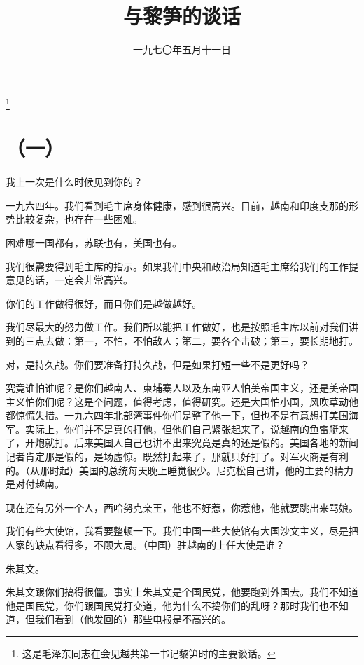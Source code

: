 
\title{与黎笋的谈话}
\date{一九七〇年五月十一日}
\thanks{这是毛泽东同志在会见越共第一书记黎笋时的主要谈话。}
\maketitle


\section*{（一）}

我上一次是什么时候见到你的？

一九六四年。我们看到毛主席身体健康，感到很高兴。目前，越南和印度支那的形势比较复杂，也存在一些困难。

困难哪一国都有，苏联也有，美国也有。

我们很需要得到毛主席的指示。如果我们中央和政治局知道毛主席给我们的工作提意见的话，一定会非常高兴。

你们的工作做得很好，而且你们是越做越好。

我们尽最大的努力做工作。我们所以能把工作做好，也是按照毛主席以前对我们讲到的三点去做：第一，不怕，不怕敌人；第二，要各个击破；第三，要长期地打。

对，是持久战。你们要准备打持久战，但是如果打短一些不是更好吗？

究竟谁怕谁呢？是你们越南人、柬埔寨人以及东南亚人怕美帝国主义，还是美帝国主义怕你们呢？这是个问题，值得考虑，值得研究。还是大国怕小国，风吹草动他都惊慌失措。一九六四年北部湾事件你们是整了他一下，但也不是有意想打美国海军。实际上，你们并不是真的打他，但他们自己紧张起来了，说越南的鱼雷艇来了，开炮就打。后来美国人自己也讲不出来究竟是真的还是假的。美国各地的新闻记者肯定那是假的，是场虚惊。既然打起来了，那就只好打了。对军火商是有利的。（从那时起）美国的总统每天晚上睡觉很少。尼克松自己讲，他的主要的精力是对付越南。

现在还有另外一个人，西哈努克亲王，他也不好惹，你惹他，他就要跳出来骂娘。

我们有些大使馆，我看要整顿一下。我们中国一些大使馆有大国沙文主义，尽是把人家的缺点看得多，不顾大局。（中国）驻越南的上任大使是谁？

朱其文。

朱其文跟你们搞得很僵。事实上朱其文是个国民党，他要跑到外国去。我们不知道他是国民党，你们跟国民党打交道，他为什么不捣你们的乱呀？那时我们也不知道，但我们看到（他发回的）那些电报是不高兴的。


